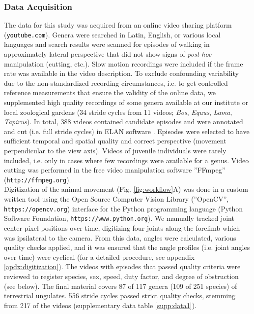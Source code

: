 \subsubsection{Data Acquisition}
The data for this study was acquired from an online video sharing platform (\nolinkurl{youtube.com}).
Genera were searched in Latin, English, or various local languages and search results were scanned for episodes of walking in approximately lateral perspective that did not show signs of \textit{post hoc} manipulation (cutting, etc.).
Slow motion recordings were included if the frame rate was available in the video description.
To exclude confounding variability due to the non-standardized recording circumstances, i.e. to get controlled reference measurements that ensure the validity of the online data, we supplemented high quality recordings of some genera available at our institute or local zoological gardens (34 stride cycles from 11 videos; \textit{Bos}, \textit{Equus}, \textit{Lama}, \textit{Tapirus}).
In total, 388 videos contained candidate episodes and were annotated and cut (i.e. full stride cycles) in ELAN software \cite[Max Planck Institute for Psycholinguistics, Nijmegen;][]{Brugman2004}.
Episodes were selected to have sufficient temporal and spatial quality and correct perspective (movement perpendicular to the view axis).
Videos of juvenile individuals were rarely included, i.e. only in cases where few recordings were available for a genus.
Video cutting was performed in the free video manipulation software ''FFmpeg'' (\nolinkurl{http://ffmpeg.org}).
\\Digitization of the animal movement (Fig. \ref{fig:workflow}A) was done in a custom-written tool using the Open Source Computer Vision Library (''OpenCV'', \nolinkurl{https://opencv.org}) interface for the Python programming language (Python Software Foundation, \nolinkurl{https://www.python.org}).
We manually tracked joint center pixel positions over time, digitizing four joints along the forelimb which was ipsilateral to the camera.
From this data, angles were calculated, various quality checks applied, and it was ensured that the angle profiles (i.e. joint angles over time) were cyclical (for a detailed procedure, see appendix \ref*{apdx:digitization}).
The videos with episodes that passed quality criteria were reviewed to register species, sex, speed, duty factor, and degree of obstruction (see below).
The final material covers 87 of 117 genera (109 of 251 species) of terrestrial ungulates.
556 stride cycles passed strict quality checks, stemming from 217 of the videos (supplementary data table \ref*{supp:data1}).


